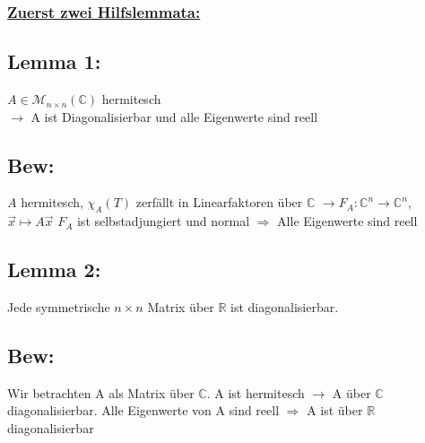 \documentclass[titlepage,12pt,a4paper,ngerman]{report}
\begin{document}
\subsubsection*{\underline{Zuerst zwei Hilfslemmata:}}

\subsection{Lemma 1:}
$ A \in \mathcal{M}_{n\times n}(\mathbb{C}) $ hermitesch\\
$ \rightarrow $ A ist Diagonalisierbar und alle Eigenwerte sind reell
\subsection{Bew:}
$ A $ hermitesch, $ \chi_A(T) $ zerfällt in Linearfaktoren über $ \mathbb{C} $ $ \rightarrow F_A: \mathbb{C}^n \to \mathbb{C}^n$, \\ $\vec{x} \mapsto A\vec{x}$ $ F_A $ ist selbstadjungiert und normal $ \Rightarrow $ Alle Eigenwerte sind reell
\subsection{Lemma 2:}
Jede symmetrische $ n\times n $ Matrix über $ \mathbb{R} $ ist diagonalisierbar.
\subsection{Bew:}
Wir betrachten A als Matrix über $ \mathbb{C} $. A ist hermitesch $ \rightarrow $ A über $ \mathbb{C} $ diagonalisierbar. Alle Eigenwerte von A sind reell $ \Rightarrow $ A ist über $ \mathbb{R} $ diagonalisierbar
\end{document}
